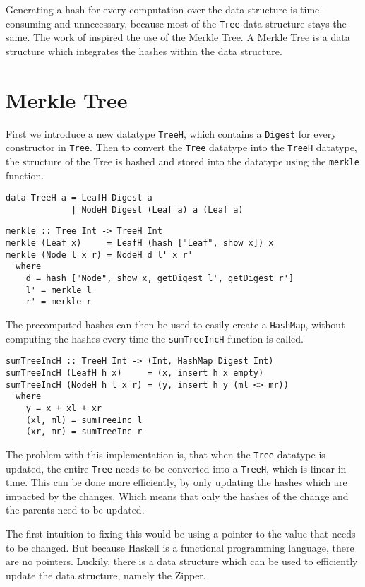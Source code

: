 Generating a hash for every computation over the data structure is time-consuming and unnecessary, because most of the \texttt{Tree} data structure stays the same. The work of \citeauthor{miraldo2019efficient}\cite{miraldo2019efficient} inspired the use of the Merkle Tree. A Merkle Tree is a data structure which integrates the hashes within the data structure.

\section{Merkle Tree}
First we introduce a new datatype \texttt{TreeH}, which contains a \texttt{Digest} for every constructor in \texttt{Tree}. Then to convert the \texttt{Tree} datatype into the \texttt{TreeH} datatype, the structure of the Tree is hashed and stored into the datatype using the \texttt{merkle} function.

\begin{verbatim}
data TreeH a = LeafH Digest a
             | NodeH Digest (Leaf a) a (Leaf a)
\end{verbatim}

\begin{verbatim}
merkle :: Tree Int -> TreeH Int
merkle (Leaf x)     = LeafH (hash ["Leaf", show x]) x
merkle (Node l x r) = NodeH d l' x r'
  where
    d = hash ["Node", show x, getDigest l', getDigest r']
    l' = merkle l
    r' = merkle r
\end{verbatim}

The precomputed hashes can then be used to easily create a \texttt{HashMap}, without computing the hashes every time the \texttt{sumTreeIncH} function is called.

\begin{verbatim}
sumTreeIncH :: TreeH Int -> (Int, HashMap Digest Int)
sumTreeIncH (LeafH h x)     = (x, insert h x empty)
sumTreeIncH (NodeH h l x r) = (y, insert h y (ml <> mr))
  where
    y = x + xl + xr
    (xl, ml) = sumTreeInc l
    (xr, mr) = sumTreeInc r
\end{verbatim}

The problem with this implementation is, that when the \texttt{Tree} datatype is updated, the entire \texttt{Tree} needs to be converted into a \texttt{TreeH}, which is linear in time. This can be done more efficiently, by only updating the hashes which are impacted by the changes. Which means that only the hashes of the change and the parents need to be updated. 

The first intuition to fixing this would be using a pointer to the value that needs to be changed. But because Haskell is a functional programming language, there are no pointers. Luckily, there is a data structure which can be used to efficiently update the data structure, namely the Zipper\cite{huet1997zipper}.

